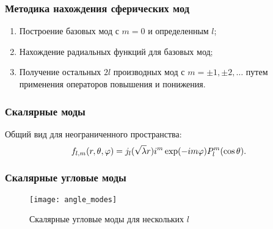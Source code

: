 \documentclass{beamer}
\begin{document}

    \begin{frame}\frametitle{Методика нахождения сферических мод}

        \begin{enumerate}
            \item Построение базовых мод с $m = 0$ и определенным $l$;
            \item Нахождение радиальных функций для базовых мод;
            \item Получение остальных $2l$ производных мод с $m = \pm 1, \pm 2, \dots$ путем применения операторов повышения и понижения.
        \end{enumerate}

    \end{frame}


    \begin{frame}\frametitle{Скалярные моды}

        Общий вид для неограниченного пространства:
        \begin{equation}
            f_{l,m}(r,\theta,\varphi)
                = j_l(\sqrt{\lambda} r) i^m \exp(- i m \varphi) P^m_l\qty(\cos\theta) .
        \end{equation}

    \end{frame}


    \begin{frame}\frametitle{Скалярные угловые моды}

        \begin{figure}[h]
            \centering
            \texttt{[image: angle\_modes]}
            \caption[]{Скалярные угловые моды для нескольких $l$}
            \label{fig:angle_modes}
        \end{figure}

    \end{frame}
\end{document}

